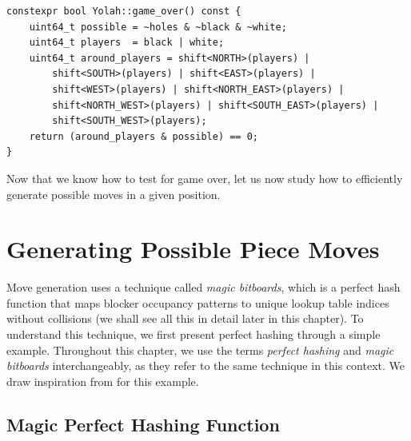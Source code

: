 \documentclass[12pt,a4paper,twoside,openright]{book}
\begin{document}
\begin{mdframed}[skipabove=\baselineskip,hidealllines=true]
\begin{verbatim}
constexpr bool Yolah::game_over() const {
    uint64_t possible = ~holes & ~black & ~white;
    uint64_t players  = black | white;
    uint64_t around_players = shift<NORTH>(players) | 
        shift<SOUTH>(players) | shift<EAST>(players) | 
        shift<WEST>(players) | shift<NORTH_EAST>(players) | 
        shift<NORTH_WEST>(players) | shift<SOUTH_EAST>(players) | 
        shift<SOUTH_WEST>(players);
    return (around_players & possible) == 0;    
}
\end{verbatim}
\label{lst:game_over}
\end{mdframed}

Now that we know how to test for game over, let us now study how to efficiently generate possible moves in a given position.

\section{Generating Possible Piece Moves}

Move generation uses a technique called \emph{magic bitboards}, which is a perfect hash function that maps blocker occupancy patterns to unique lookup table indices without collisions %
(we shall see all this in detail later in this chapter). To understand this technique, we first present perfect hashing through a simple example. Throughout this chapter, we use the terms \emph{perfect hashing} and \emph{magic bitboards} interchangeably, as they refer to the same technique in this context. We draw inspiration from \cite{kannan2008magicbitboards} for this example.

\subsection{Magic Perfect Hashing Function}
\end{document}
